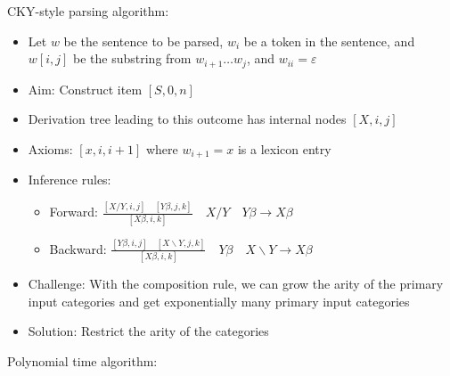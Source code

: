 CKY-style parsing algorithm:
\begin{itemize}
    \item Let $w$ be the sentence to be parsed, $w_i$ be a token in the sentence, and $w[i, j]$ be the substring from $w_{i+1} \dots w_j$, and $w_{ii} = \varepsilon$
    \item Aim: Construct item $[S, 0, n]$
    \item Derivation tree leading to this outcome has internal nodes $[X, i, j]$
    \item Axioms: $[x, i, i+1]$ where $w_{i+1} = x$ is a lexicon entry
    \item Inference rules:
    \begin{itemize}
        \item Forward:
        $
        \frac{[X / Y, i, j] \quad [Y \beta, j, k]}{[X \beta, i, k]} \quad X / Y \quad Y \beta \to X \beta
        $
        \item Backward:
        $
        \frac{[Y \beta, i, j] \quad [X \backslash Y, j, k]}{[X \beta, i, k]} \quad Y \beta \quad X \backslash Y \to X \beta
        $
    \end{itemize}
    \item Challenge: With the composition rule, we can grow the arity of the primary input categories and get exponentially many primary input categories
    \item Solution: Restrict the arity of the categories
\end{itemize}
Polynomial time algorithm:
